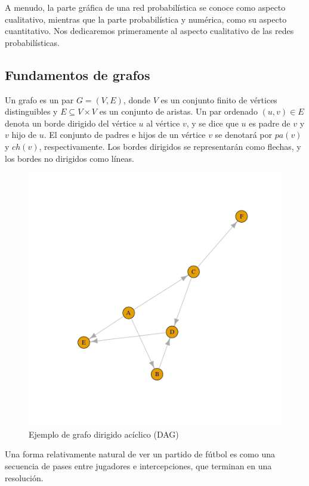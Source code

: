 A menudo, la parte gráfica de una red probabilística se conoce como aspecto cualitativo, mientras que la 
parte probabilística y numérica, como su aspecto cuantitativo. Nos dedicaremos primeramente al aspecto 
cualitativo de las redes probabilísticas.

\subsection{Fundamentos de grafos}
Un grafo es un par $G = (V, E)$, donde $V$ es un conjunto finito de vértices distinguibles y 
$E \subseteq V \times V$ es un conjunto de aristas. Un par ordenado $(u, v) \in E$ denota un borde dirigido
del vértice $u$ al vértice $v$, y se dice que $u$ es padre de $v$ y $v$ hijo de $u$.
El conjunto de padres e hijos de un vértice $v$ se denotará por $pa(v)$ y $ch(v)$, respectivamente.
Los bordes dirigidos se representarán como flechas, y los bordes no dirigidos como líneas. 

\begin{figure}[h!]
    \centering
     \includegraphics[width=\textwidth]{./img/dag.png}
     \caption{Ejemplo de grafo dirigido acíclico (DAG)}
     \label{img:dag1}
    \end{figure}

Una forma relativamente natural de ver un partido de fútbol es como una secuencia de 
pases entre jugadores e intercepciones, que terminan en una resolución. 

